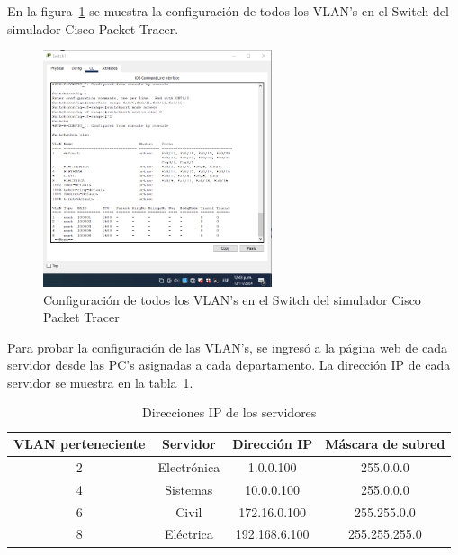        En la figura~\ref{fig:cisco_vlan_PC1} se muestra la configuración de todos los VLAN's en el Switch del simulador Cisco Packet Tracer.

        \begin{figure}[H]
            \centering
            \includegraphics[width=0.6\textwidth]{img/cisco_vlan_PC1.png}
            \caption{Configuración de todos los VLAN's en el Switch del simulador Cisco Packet Tracer}
            \label{fig:cisco_vlan_PC1}
        \end{figure}

        Para probar la configuración de las VLAN's, se ingresó a la página web de cada servidor desde las PC's asignadas a cada departamento. La dirección IP de cada servidor se muestra en la tabla~\ref{tab:IPs}.

        \begin{table}[H]
            \begin{center}
                \begin{tabular}{ c | c | c | c }
                    \textbf{VLAN perteneciente} & \textbf{Servidor} & \textbf{Dirección IP} & \textbf{Máscara de subred}\\ \hline
                    2 & Electrónica & 1.0.0.100 & 255.0.0.0\\
                    4 & Sistemas & 10.0.0.100 & 255.0.0.0\\
                    6 & Civil & 172.16.0.100 & 255.255.0.0\\
                    8 & Eléctrica & 192.168.6.100 & 255.255.255.0\\
                \end{tabular}
                \caption{Direcciones IP de los servidores}
                \label{tab:IPs}
                \end{center}
        \end{table}

